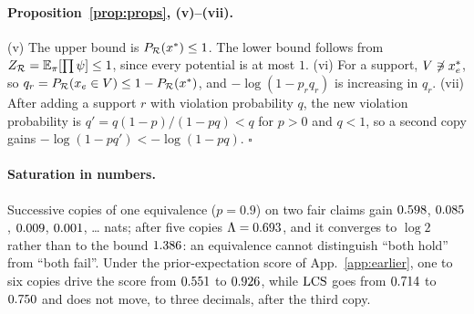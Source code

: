 \paragraph{Proposition~\ref{prop:props}, (v)--(vii).} (v) The upper bound is $P_{\mathcal{R}}(x^{\ast})\le1$. The lower bound
follows from $Z_{\mathcal{R}}=\mathbb{E}_\pi[\prod\psi]\le1$, since every potential is at most $1$. (vi) For a
support, $V\not\ni x^{\ast}_e$, so $q_r=P_{\mathcal{R}}(x_e\in V)\le1-P_{\mathcal{R}}(x^{\ast})$, and $-\log(1-p_rq_r)$ is
increasing in $q_r$. (vii) After adding a support $r$ with violation probability $q$, the new
violation probability is $q'=q(1-p)/(1-pq)<q$ for $p>0$ and $q<1$, so a second copy gains
$-\log(1-pq')<-\log(1-pq)$. $\square$

\paragraph{Saturation in numbers.} Successive copies of one equivalence ($p=0.9$) on two fair
claims gain $0.598$, $0.085$, $0.009$, $0.001$, \dots{} nats; after five
copies $\Lambda=0.693$, and it converges to $\log2$ rather than to the bound $1.386$: an
equivalence cannot distinguish ``both hold'' from ``both fail''. Under the prior-expectation score
of App.~\ref{app:earlier}, one to six copies drive the score from $0.551$ to $0.926$,
while $\mathrm{LCS}$ goes from $0.714$ to $0.750$ and does not move, to three decimals, after the
third copy.

